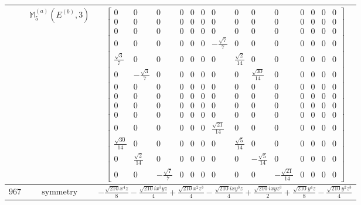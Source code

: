 \documentclass[fleqn,8pt,landscape]{jsarticle}
\begin{document}
\begin{longtable}{ccc}
$  $ & $ \mathbb{M}_{5}^{(a)}(E^{(b)},3) $ & $ \begin{bmatrix} 0 & 0 & 0 & 0 & 0 & 0 & 0 & 0 & 0 & 0 & 0 & 0 & 0 & 0 \\ 0 & 0 & 0 & 0 & 0 & 0 & 0 & 0 & 0 & 0 & 0 & 0 & 0 & 0 \\ 0 & 0 & 0 & 0 & 0 & 0 & 0 & 0 & 0 & 0 & 0 & 0 & 0 & 0 \\ 0 & 0 & 0 & 0 & 0 & 0 & - \frac{\sqrt{7}}{7} & 0 & 0 & 0 & 0 & 0 & 0 & 0 \\ \frac{\sqrt{3}}{7} & 0 & 0 & 0 & 0 & 0 & 0 & \frac{\sqrt{2}}{14} & 0 & 0 & 0 & 0 & 0 & 0 \\ 0 & - \frac{\sqrt{3}}{7} & 0 & 0 & 0 & 0 & 0 & 0 & \frac{\sqrt{30}}{14} & 0 & 0 & 0 & 0 & 0 \\ 0 & 0 & 0 & 0 & 0 & 0 & 0 & 0 & 0 & 0 & 0 & 0 & 0 & 0 \\ 0 & 0 & 0 & 0 & 0 & 0 & 0 & 0 & 0 & 0 & 0 & 0 & 0 & 0 \\ 0 & 0 & 0 & 0 & 0 & 0 & 0 & 0 & 0 & 0 & 0 & 0 & 0 & 0 \\ 0 & 0 & 0 & 0 & 0 & 0 & 0 & 0 & 0 & 0 & 0 & 0 & 0 & 0 \\ 0 & 0 & 0 & 0 & 0 & 0 & \frac{\sqrt{21}}{14} & 0 & 0 & 0 & 0 & 0 & 0 & 0 \\ \frac{\sqrt{30}}{14} & 0 & 0 & 0 & 0 & 0 & 0 & \frac{\sqrt{5}}{14} & 0 & 0 & 0 & 0 & 0 & 0 \\ 0 & \frac{\sqrt{2}}{14} & 0 & 0 & 0 & 0 & 0 & 0 & - \frac{\sqrt{5}}{14} & 0 & 0 & 0 & 0 & 0 \\ 0 & 0 & - \frac{\sqrt{7}}{7} & 0 & 0 & 0 & 0 & 0 & 0 & - \frac{\sqrt{21}}{14} & 0 & 0 & 0 & 0 \end{bmatrix} $ \\ \hline
$ 967 $ & $ \text{symmetry} $ & $ - \frac{\sqrt{210} x^{4} z}{8} - \frac{\sqrt{210} i x^{3} y z}{4} + \frac{\sqrt{210} x^{2} z^{3}}{4} - \frac{\sqrt{210} i x y^{3} z}{4} + \frac{\sqrt{210} i x y z^{3}}{2} + \frac{\sqrt{210} y^{4} z}{8} - \frac{\sqrt{210} y^{2} z^{3}}{4} $ \\

\end{longtable}
\end{document}
